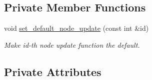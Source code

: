 \subsection*{Private Member Functions}
\begin{DoxyCompactItemize}
\item 
void \hyperlink{classoomph_1_1AlgebraicNode_a5f9d80a2826974b63376a4c58e0812fc}{set\+\_\+default\+\_\+node\+\_\+update} (const int \&id)
\begin{DoxyCompactList}\small\item\em Make id-\/th node update function the default. \end{DoxyCompactList}\end{DoxyCompactItemize}
\subsection*{Private Attributes}

